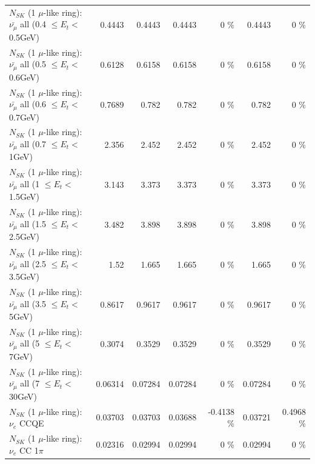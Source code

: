 \begin{table}
\begin{tabular}{| l | r | r | r  r | r  r |}
 $N_{SK}$ (1 $\mu$-like ring): $\bar{\nu_{\mu}}$ all (0.4 $\leq E_{t} <$ 0.5GeV) &          0.4443 &          0.4443 &          0.4443 &        0 \%  &          0.4443 &        0 \%  \\ 
 $N_{SK}$ (1 $\mu$-like ring): $\bar{\nu_{\mu}}$ all (0.5 $\leq E_{t} <$ 0.6GeV) &          0.6128 &          0.6158 &          0.6158 &        0 \%  &          0.6158 &        0 \%  \\ 
 $N_{SK}$ (1 $\mu$-like ring): $\bar{\nu_{\mu}}$ all (0.6 $\leq E_{t} <$ 0.7GeV) &          0.7689 &           0.782 &           0.782 &        0 \%  &           0.782 &        0 \%  \\ 
   $N_{SK}$ (1 $\mu$-like ring): $\bar{\nu_{\mu}}$ all (0.7 $\leq E_{t} <$ 1GeV) &           2.356 &           2.452 &           2.452 &        0 \%  &           2.452 &        0 \%  \\ 
   $N_{SK}$ (1 $\mu$-like ring): $\bar{\nu_{\mu}}$ all (1 $\leq E_{t} <$ 1.5GeV) &           3.143 &           3.373 &           3.373 &        0 \%  &           3.373 &        0 \%  \\ 
 $N_{SK}$ (1 $\mu$-like ring): $\bar{\nu_{\mu}}$ all (1.5 $\leq E_{t} <$ 2.5GeV) &           3.482 &           3.898 &           3.898 &        0 \%  &           3.898 &        0 \%  \\ 
 $N_{SK}$ (1 $\mu$-like ring): $\bar{\nu_{\mu}}$ all (2.5 $\leq E_{t} <$ 3.5GeV) &            1.52 &           1.665 &           1.665 &        0 \%  &           1.665 &        0 \%  \\ 
   $N_{SK}$ (1 $\mu$-like ring): $\bar{\nu_{\mu}}$ all (3.5 $\leq E_{t} <$ 5GeV) &          0.8617 &          0.9617 &          0.9617 &        0 \%  &          0.9617 &        0 \%  \\ 
     $N_{SK}$ (1 $\mu$-like ring): $\bar{\nu_{\mu}}$ all (5 $\leq E_{t} <$ 7GeV) &          0.3074 &          0.3529 &          0.3529 &        0 \%  &          0.3529 &        0 \%  \\ 
    $N_{SK}$ (1 $\mu$-like ring): $\bar{\nu_{\mu}}$ all (7 $\leq E_{t} <$ 30GeV) &         0.06314 &         0.07284 &         0.07284 &        0 \%  &         0.07284 &        0 \%  \\ 
\hline
\hline
\hline
                                      $N_{SK}$ (1 $\mu$-like ring): $\nu_e$ CCQE &         0.03703 &         0.03703 &         0.03688 &  -0.4138 \%  &         0.03721 &   0.4968 \%  \\ 
                                 $N_{SK}$ (1 $\mu$-like ring): $\nu_e$ CC 1$\pi$ &         0.02316 &         0.02994 &         0.02994 &        0 \%  &         0.02994 &        0 \%  \\ 

\end{tabular}
\end{table}
